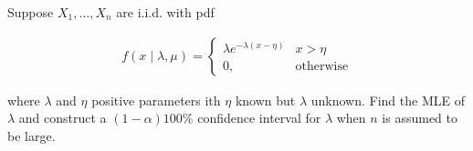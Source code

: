 
\begin{exercise}

Suppose $X_1, \dots, X_n$ are i.i.d. with pdf

\begin{align*}
    f(x \mid \lambda, \mu)
    =
    \begin{cases}
        \lambda e^{-\lambda (x - \eta)}
        & x > \eta \\
        0,
        & \text{otherwise}
    \end{cases}
\end{align*}

where $\lambda$ and $\eta$ positive parameters ith $\eta$ known but $\lambda$ unknown.
Find the MLE of $\lambda$ and construct a $(1 - \alpha) 100 \%$ confidence interval for $\lambda$ when $n$ is assumed to be large.

\end{exercise}


